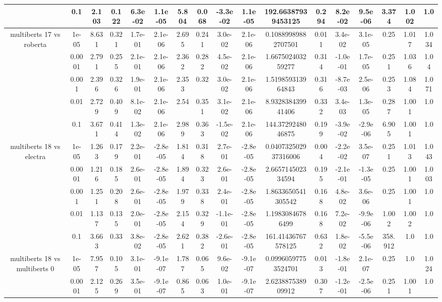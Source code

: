 \begin{tabular}{|c|c|c|c|c|c|c|c|c|c|c|c|c|c|c|c|c|}
 & 0.1 & 2.103 & 0.122 & 6.3e-02 & 1.1e-05 & 5.804 & 0.068 & -3.3e-02 & 1.1e-05 & 192.66387939453125 & 0.294 & 8.2e-02 & 9.5e-06 & 3.374 & 1.002 & 1.0 \\
\hline
\multirow{5}{*}{multiberts 17 vs roberta } & 1e-05 & 8.631 & 0.321 & 1.7e-01 & 2.1e-06 & 2.695 & 0.241 & 3.0e-02 & 2.1e-06 & 0.10889989882707501 & 0.011 & 3.4e-02 & 3.1e-05 & 0.25 & 1.017 & 1.034 \\
 & 0.0001 & 2.791 & 0.255 & 2.1e-01 & 2.1e-06 & 2.362 & 0.282 & 4.5e-02 & 2.1e-06 & 1.667502403259277 & 0.314 & -1.0e-01 & 1.7e-05 & 0.251 & 1.036 & 1.04 \\
 & 0.001 & 2.396 & 0.326 & 1.9e-01 & 2.1e-06 & 2.353 & 0.32 & 3.0e-02 & 2.1e-06 & 1.519859313964843 & 0.316 & -8.7e-03 & 2.5e-06 & 0.253 & 1.084 & 1.071 \\
 & 0.01 & 2.729 & 0.409 & 8.1e-02 & 2.1e-06 & 2.54 & 0.351 & 3.1e-02 & 2.1e-06 & 8.932838439941406 & 0.332 & 3.4e-03 & 1.3e-05 & 0.287 & 1.001 & 1.0 \\
 & 0.1 & 3.671 & 0.414 & 1.3e-02 & 2.1e-06 & 2.989 & 0.363 & -1.5e-02 & 2.1e-06 & 144.3729248046875 & 0.199 & -3.9e-02 & -2.9e-06 & 6.905 & 1.001 & 1.0 \\
\hline
\multirow{5}{*}{multiberts 18 vs electra } & 1e-05 & 1.263 & 0.179 & 2.2e-01 & -2.8e-05 & 1.814 & 0.318 & 2.7e-01 & -2.8e-05 & 0.040732502937316006 & 0.004 & -2.2e-02 & 3.5e-07 & 0.251 & 1.013 & 1.043 \\
 & 0.0001 & 1.216 & 0.185 & 2.6e-01 & -2.8e-05 & 1.894 & 0.323 & 2.6e-01 & -2.8e-05 & 2.665714502334594 & 0.195 & -2.1e-01 & -1.3e-05 & 0.25 & 1.001 & 1.003 \\
 & 0.001 & 1.251 & 0.208 & 2.6e-01 & -2.8e-05 & 1.979 & 0.338 & 2.4e-01 & -2.8e-05 & 1.8633650541305542 & 0.168 & 4.8e-02 & 3.6e-06 & 0.25 & 1.001 & 1.0 \\
 & 0.01 & 1.137 & 0.135 & 2.0e-01 & -2.8e-05 & 2.154 & 0.329 & -1.1e-01 & -2.8e-05 & 1.19830846786499 & 0.168 & 7.2e-02 & -9.9e-06 & 1.002 & 1.002 & 1.0 \\
 & 0.1 & 3.663 & 0.33 & 3.8e-02 & -2.8e-05 & 2.621 & 0.382 & -2.6e-01 & -2.8e-05 & 161.41436767578125 & 0.632 & 1.8e-02 & -5.5e-06 & 358.912 & 1.0 & 1.0 \\
\hline
\multirow{5}{*}{multiberts 18 vs multiberts 0} & 1e-05 & 7.957 & 0.105 & 3.1e-01 & -9.1e-07 & 1.787 & 0.065 & 9.6e-02 & -9.1e-07 & 0.09960597753524701 & 0.013 & -1.8e-01 & 2.1e-07 & 0.25 & 1.0 & 1.024 \\
 & 0.0001 & 2.125 & 0.269 & 3.5e-01 & -9.1e-07 & 0.865 & 0.063 & 1.0e-01 & -9.1e-07 & 2.623887538909912 & 0.307 & -1.2e-01 & -2.5e-06 & 0.251 & 1.001 & 1.0 \\

\end{tabular}
